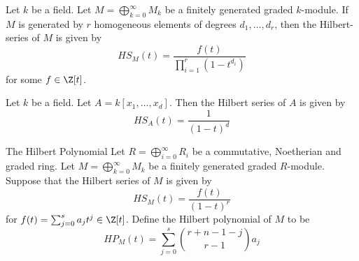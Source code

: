 \documentclass[a4paper]{article}
\begin{document}
\begin{prp}{}{} Let $k$ be a field. Let $M=\bigoplus_{k=0}^\infty M_k$ be a finitely generated graded $k$-module. If $M$ is generated by $r$ homogeneous elements of degrees $d_1,\dots,d_r$, then the Hilbert-series of $M$ is given by $$HS_M(t)=\frac{f(t)}{\prod_{i=1}^r(1-t^{d_i})}$$ for some $f\in\Z[t]$. 
\end{prp}

\begin{eg}{}{} Let $k$ be a field. Let $A=k[x_1,\dots,x_d]$. Then the Hilbert series of $A$ is given by $$HS_A(t)=\frac{1}{(1-t)^d}$$
\end{eg}

\begin{defn}{The Hilbert Polynomial}{} Let $R=\bigoplus_{i=0}^\infty R_i$ be a commutative, Noetherian and graded ring. Let $M=\bigoplus_{k=0}^\infty M_k$ be a finitely generated graded $R$-module. Suppose that the Hilbert series of $M$ is given by $$HS_M(t)=\frac{f(t)}{(1-t)^r}$$ for $f(t)=\sum_{j=0}^sa_jt^j\in\Z[t]$. Define the Hilbert polynomial of $M$ to be $$HP_M(t)=\sum_{j=0}^s\binom{r+n-1-j}{r-1}a_j$$
\end{defn}
\end{document}
